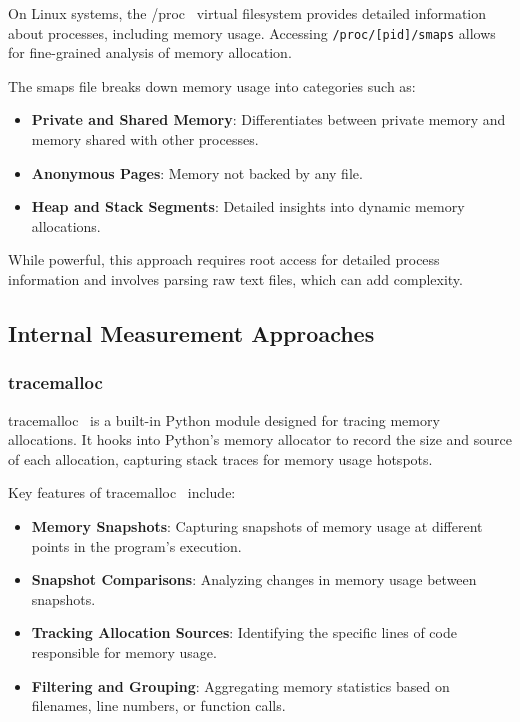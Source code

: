 On Linux systems, the /proc~\cite{procfs} virtual filesystem provides detailed information about processes, including memory usage.
Accessing \texttt{/proc/[pid]/smaps} allows for fine-grained analysis of memory allocation.

The smaps file breaks down memory usage into categories such as:

\begin{itemize}
    \item \textbf{Private and Shared Memory}:
    Differentiates between private memory and memory shared with other processes.

    \item \textbf{Anonymous Pages}:
    Memory not backed by any file.

    \item \textbf{Heap and Stack Segments}:
    Detailed insights into dynamic memory allocations.
\end{itemize}

While powerful, this approach requires root access for detailed process information and involves parsing raw text files, which can add complexity.

\subsection{Internal Measurement Approaches}

\subsubsection{tracemalloc}

tracemalloc~\cite{tracemalloc} is a built-in Python module designed for tracing memory allocations.
It hooks into Python's memory allocator to record the size and source of each allocation, capturing stack traces for memory usage hotspots.

Key features of tracemalloc~\cite{tracemalloc} include:

\begin{itemize}
    \item \textbf{Memory Snapshots}:
    Capturing snapshots of memory usage at different points in the program's execution.

    \item \textbf{Snapshot Comparisons}:
    Analyzing changes in memory usage between snapshots.

    \item \textbf{Tracking Allocation Sources}:
    Identifying the specific lines of code responsible for memory usage.

    \item \textbf{Filtering and Grouping}:
    Aggregating memory statistics based on filenames, line numbers, or function calls.
\end{itemize}

